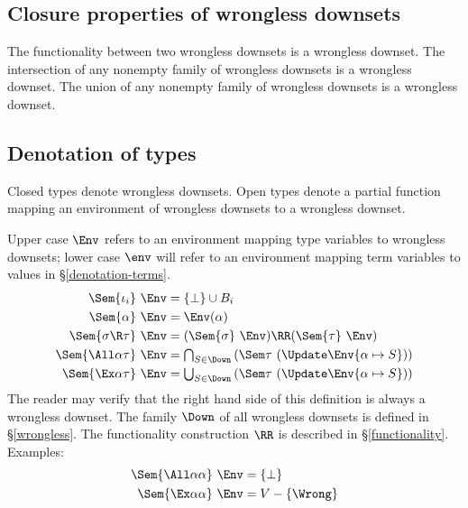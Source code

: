\documentclass{amsart}
\theoremstyle{definition}
\begin{document}
\subsection{Closure properties of wrongless downsets}
The functionality between two wrongless downsets is a wrongless
downset. The intersection of any nonempty family of wrongless
downsets is a wrongless downset. The union of any nonempty family
of wrongless downsets is a wrongless downset.

\subsection{Denotation of types}
\label{denotation-types}
Closed types denote wrongless downsets. Open types denote a
partial function mapping an environment of wrongless downsets to
a wrongless downset.

Upper case $\Env$ refers to an environment mapping type variables
to wrongless downsets; lower case $\env$ will refer to an environment
mapping term variables to values in \S\ref{denotation-terms}.
\begin{align*}
\Sem{\iota_i}~\Env &= \{\bot\}\cup B_i\\
\Sem{\alpha}~\Env &= \Env(\alpha)\\
\Sem{\sigma\R\tau}~\Env&=
  (\Sem{\sigma}~\Env)\RR(\Sem{\tau}~\Env)\\
\Sem{\All\alpha\tau}~\Env&=
  {\textstyle\bigcap_{S\in\Down}}
  \left(\Sem\tau~(\Update\Env{\alpha\mapsto S})\right)\\
\Sem{\Ex\alpha\tau}~\Env&=
  {\textstyle\bigcup_{S\in\Down}}
  \left(\Sem\tau~(\Update\Env{\alpha\mapsto S})\right)
\end{align*}
The reader may verify that the right hand side of this definition
is always a wrongless downset. The family $\Down$ of all
wrongless downsets is defined in \S\ref{wrongless}. The
functionality construction $\RR$ is described in
\S\ref{functionality}. Examples:
\begin{align*}
\Sem{\All\alpha\alpha}~\Env&=\{\bot\}\\
\Sem{\Ex\alpha\alpha}~\Env&=V-\{\Wrong\}
\end{align*}
\end{document}
